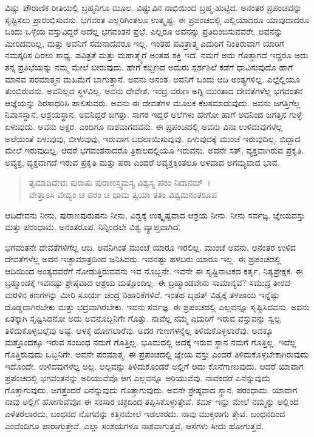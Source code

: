 ವಿಷ್ಣು ಪೌರಾಣಿಕ ರೀತಿಯಲ್ಲಿ ಬ್ರಹ್ಮನಿಗೂ ಮೂಲ. ವಿಷ್ಣುವಿನ ನಾಭಿಯಿಂದ ಬ್ರಹ್ಮ ಹುಟ್ಟಿದ. ಅನಂತರ ಪ್ರಪಂಚವನ್ನು ಸೃಷ್ಟಿಸಲು ಪ್ರಾರಂಭಿಸುವನು. ಭಗವಂತ ಎಲ್ಲರಿಗಿಂತಲೂ ಉತ್ಕೃಷ್ಟ. ಈ ಪ್ರಪಂಚದಲ್ಲಿ ಎಲ್ಲಿಯಾದರೂ ಯಾವುದಾದರೂ ಒಂದು ಒಳ್ಳೆಯ ವಸ್ತುವಿದ್ದರೆ ಅದೆಲ್ಲ ಭಗವಂತನ ಪ್ರಭೆ. ಎಲ್ಲರೂ ಅವನನ್ನು ಪ್ರತಿಬಿಂಬಿಸುವವರೇ. ಅವನನ್ನು ಮೀರಿದವರಿಲ್ಲ, ಮತ್ತು ಅವನಿಗೆ ಸಮನಾದವರೂ ಇಲ್ಲ. ಇಂತಹ ಪವಿತ್ರಾತ್ಮ ಎದುರಿಗೆ ನಿಂತಿರುವಾಗ ಯಾರಿಗೆ ನಮಸ್ಕರಿಸ ದಿರಲು ಸಾಧ್ಯ. ಪವಿತ್ರತೆ ಮತ್ತು ಮಹಾತ್ಮ್ಯೆಗೆ ಅಂತಹ ಶಕ್ತಿ ಇದೆ. ನಮಗೆ ಅದು ಗೊತ್ತಾಗದೆ ಇದ್ದರೂ ಅದು ತನ್ನ ಪ್ರತಿಭೆಯನ್ನು ನಮ್ಮ ಮೇಲೆ ಬೀರುವುದು. ಹೇಗೆ ಕಬ್ಬಿಣದ ಅದುರು ಸ್ಪರ್ಶಶಿಲೆ ಕಡೆಗೆ ಧಾವಿಸುವುದೊ ಹಾಗೆ ಮಾನವ ಪರಮಾತ್ಮನ ಮಹಿಮೆಗೆ ಬಾಗುತ್ತಾನೆ. ಅವನು ಅನಂತ. ಅವನಿಗೆ ಒಂದು ಆದಿ ಅಂತ್ಯಗಳಿಲ್ಲ. ಎಲ್ಲೆಲ್ಲಿಯೂ ತುಂಬಿರುವನು. ಅವನಿಲ್ಲದ ಸ್ಥಳವಿಲ್ಲ. ಅವನು ದೇವೇಶ. ಇಂದ್ರ ವರುಣ ಅಗ್ನಿ ಮುಂತಾದ ದೇವತೆಗಳೆಲ್ಲ ಭಗವಂತನ ಆಜ್ಞೆಯನ್ನು ಶಿರಸಾಧರಿಸಿ ಪಾಲಿಸುವರು. ಅವನು ಈ ದೇವತೆಗಳ ಮೂಲಕ ಕೆಲಸಮಾಡುವುದು. ಅವನು ಜಗತ್ತಿಗೆಲ್ಲ ನಿವಾಸಸ್ಥಾನ, ಆಶ್ರಯಸ್ಥಾನ. ಅವನಿದ್ದರೆ ಜಗತ್ತು. ಸಾಗರ ಇದ್ದರೆ ಅಲೆಗಳು ಹೇಗೋ ಹಾಗೆ ಅವನಿಂದ ಜಗತ್ತಿನ ಗುಳ್ಳೆ ಏಳುವುದು. ಅವನು ಅಕ್ಷರ. ಎಂದಿಗೂ ನಾಶವಾಗದವನು. ಈ ಪ್ರಪಂಚದಲ್ಲಿ ಅವನು ವಿನಾ ಉಳಿದುವುಗಳೆಲ್ಲ ಅಲೆಯಂತೆ ಏಳುವುವು, ಬೀಳುವುವು, ಇರುವಾಗ ಬದಲಾಯಿಸುವುವು. ಏಳುವುದಕ್ಕೆ ಮುಂಚೆ ಇರುವುದಿಲ್ಲ. ಬಿದ್ದಾದ ಮೇಲೆ ಇರುವುದಿಲ್ಲ. ಆದರೆ ಭಗವಂತನಾದರೊ ತ್ರಿಕಾಲದಲ್ಲಿಯೂ ಇರುವನು. ಅವನೇ ಸತ್, ವ್ಯಕ್ತವಾಗಿರುವ ಪ್ರಕೃತಿ. ಅವ್ಯಕ್ತ, ವ್ಯಕ್ತವಾಗದೆ ಇರುವ ಪ್ರಕೃತಿ ಮತ್ತು ಪರಾ ಎಂದರೆ ಅವ್ಯಕ್ತಕ್ಕಿಂತಲೂ ಆಳವಾದ ಅಗಮ್ಯವಾದ ಭಾವ.

\begin{verse}
ತ್ವಮಾದಿದೇವಃ ಪುರುಷಃ ಪುರಾಣಸ್ತ್ವಮಸ್ಯ ವಿಶ್ವಸ್ಯ ಪರಂ ನಿದಾನಮ್~।\\ವೇತ್ತಾಽಸಿ ವೇದ್ಯಂ ಚ ಪರಂ ಚ ಧಾಮ ತ್ವಯಾ ತತಂ ವಿಶ್ವಮನಂತರೂಪ 
\end{verse}

{\small ಆದಿದೇವನು ನೀನು, ಪುರಾಣಪುರುಷನು ನೀನು, ವಿಶ್ವಕ್ಕೆ ಉತ್ಕೃಷ್ಟವಾದ ಆಶ್ರಯ ನೀನು. ನೀನು ಸರ್ವಜ್ಞ. ಜ್ಞೇಯವಸ್ತು ಮತ್ತು ಪರಂಧಾಮ. ಅನಂತರೂಪ. ನಿನ್ನಿಂದಲೇ ವಿಶ್ವ ವ್ಯಾಪ್ತವಾಗಿದೆ.}

ಭಗವಂತನೇ ದೇವತೆಗಳಿಗೆಲ್ಲ ಆದಿ. ಅವನಿಗಿಂತ ಮುಂಚೆ ಯಾರೂ ಇರಲಿಲ್ಲ. ಮುಂಚೆ ಅವನು, ಅನಂತರ ಉಳಿದ ದೇವತೆಗಳೆಲ್ಲ ಅವನ ಇಚ್ಛಾಮಾತ್ರದಿಂದ ಜನಿಸಿದರು. ಇವನಷ್ಟು ಹಳಬರು ಯಾರೂ ಇಲ್ಲ. ಈ ಪ್ರಪಂಚದಲ್ಲಿ ಆದಿಯಿಂದ ಅಂತ್ಯದವರೆಗೆ ನೋಡುತ್ತಿರುವವನು ಇವ ನೊಬ್ಬನೇ. ಇವನೇ ಈ ಸೃಷ್ಟಿನಾಟಕದ ಕರ್ತೃ, ನಿತ್ಯಪ್ರೇಕ್ಷಕ. ಈ ಬ್ರಹ್ಮಾಂಡಕ್ಕೆ ಇವನಷ್ಟು ಶ್ರೇಷ್ಠವಾದ ಆಶ್ರಯ ಮತ್ತೊಂದಿಲ್ಲ. ಈ ಬ್ರಹ್ಮಾಂಡವೇನು ಸಾಮಾನ್ಯವೆ? ಸಮುದ್ರ ತೀರದ ಮರಳಿನ ಕಣಗಳನ್ನು ಮೀರಿ ಸೂರ್ಯ ಚಂದ್ರ ನಿಹಾರಿಕೆಗಳಿವೆ. ಇಂತಹ ಬೃಹತ್ ವಿಶ್ವಕ್ಕೆ ತಳಪಾಯ ಇನ್ನೆಷ್ಟು ದೊಡ್ಡದಾಗಿರಬೇಕು ಮತ್ತು ಭದ್ರವಾಗಿರಬೇಕು. ಇವನು ಸರ್ವಜ್ಞ. ಈ ಪ್ರಪಂಚದಲ್ಲಿ ಎಲ್ಲವನ್ನೂ ಸೃಷ್ಟಿಸಿದವನು. ಅವನು ಏತಕ್ಕಾಗಿ ಸೃಷ್ಟಿಸಿದನೋ ಅದು ಅವನೊಬ್ಬನಿಗೇ ಗೊತ್ತು. ನಾವೆಲ್ಲ ನಮ್ಮ ಎದುರಿಗೆ ಇರುವ ವಸ್ತುವನ್ನು ಸ್ವಲ್ಪ ತಿಳಿದುಕೊಳ್ಳಬಲ್ಲೆವು ಅಷ್ಟೆ. ಆಳಕ್ಕೆ ಹೋಗಲಾರೆವು. ಅದರ ಗುಣಗಳನ್ನೆಲ್ಲ ತಿಳಿದುಕೊಳ್ಳಲಾರೆವು. ಅದಕ್ಕೂ ಮತ್ತೊಂದಕ್ಕೂ ಇರುವ ಸಂಬಂಧ ನಮಗೆ ಗೊತ್ತಿಲ್ಲ. ಭೂಮದಲ್ಲಿ ಅದಕ್ಕೆ ಇರುವ ಸ್ಥಾನ ನಮಗೆ ಗೊತ್ತಿಲ್ಲ. ಇದೆಲ್ಲ ಗೊತ್ತಿರುವುದು ಒಬ್ಬನಿಗೇ. ಅವನೇ ಪರಮಾತ್ಮ. ಈ ಪ್ರಪಂಚದಲ್ಲಿ ಜ್ಞೇಯ ವಸ್ತು ಎಂದರೆ ತಿಳಿದುಕೊಳ್ಳಬೇಕಾಗಿರುವುದು ಇದೊಂದೇ. ಉಳಿದವುಗಳೆಲ್ಲ ಅಲ್ಪ. ಅಲ್ಪವನ್ನು ತಿಳಿದುಕೊಂಡರೆ ಅಲ್ಲಿಗೆ ಅದು ಕೊನೆಗಾಣುವುದು. ಆದರೆ ಯಾವಾಗ ಪ್ರಪಂಚದಲ್ಲಿ ಭಗವಂತನನ್ನು ಅರಿಯುವೆವೊ ಆಗ ಎಲ್ಲವನ್ನೂ ಅರಿಯುವೆವು. ನಾವೆಂದರೆ ಏನೆನ್ನುವುದು ಗೊತ್ತಾಗುವುದು, ಜಗತ್ತೆಂದರೆ ಏನೆನ್ನುವುದು ಗೊತ್ತಾಗುವುದು. ಅವನೇ ಶ್ರೇಷ್ಠವಾದ ಸ್ಥಾನ, ಪರಂಧಾಮ. ಯಾವಾಗ ನಾವು ಅಲ್ಲಿಗೆ ಹೋಗುವೆವೋ ಈ ಸಂಸಾರ ಚಕ್ರದಿಂದ ತಪ್ಪಿಸಿಕೊಳ್ಳುತ್ತೇವೆ. ಕರ್ಮ ಇನ್ನು ಮೇಲೆ ನಮ್ಮನ್ನು ಅಲ್ಲಿಂದ ಎಳೆತರಲಾರದು, ಬಂಧನದ ನೊಗವನ್ನು ಕತ್ತಿನಮೇಲೆ ಇಡಲಾರದು. ನಾವು ಮುಕ್ತರಾಗು ತ್ತೇವೆ, ಬಂಧನದಿಂದ ಎಂದೆಂದಿಗೂ ಪಾರಾಗುತ್ತೇವೆ. ಎಲ್ಲಾ ಸಂಶಯಗಳೂ ನಾಶವಾಗುತ್ತವೆ, ಆಸೆಗಳು ಸೀದು ಹೋಗುತ್ತವೆ.

